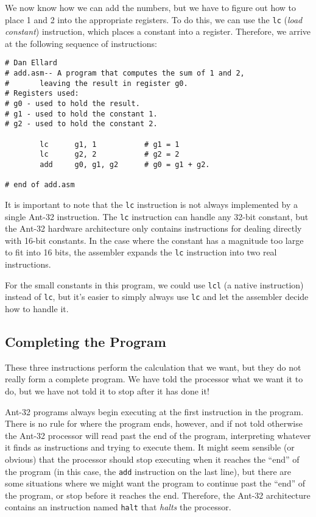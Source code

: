 We now know how we can add the numbers, but we have to figure out how
to place 1 and 2 into the appropriate registers.  To do this, we can
use the {\tt lc} ({\em load constant}) instruction, which places a
constant into a register.  Therefore, we arrive at the following
sequence of instructions:

{\codesize
\begin{verbatim}
# Dan Ellard
# add.asm-- A program that computes the sum of 1 and 2,
#       leaving the result in register g0.
# Registers used:
# g0 - used to hold the result.
# g1 - used to hold the constant 1.
# g2 - used to hold the constant 2.

        lc      g1, 1           # g1 = 1
        lc      g2, 2           # g2 = 2
        add     g0, g1, g2      # g0 = g1 + g2.

# end of add.asm
\end{verbatim}}

It is important to note that the {\tt lc} instruction is not
always implemented by a single Ant-32 instruction.  The {\tt lc}
instruction can handle any 32-bit constant, but the Ant-32
hardware architecture only contains instructions for dealing directly
with 16-bit constants.  In the case where the constant has a magnitude
too large to fit into 16 bits, the assembler expands the {\tt lc}
instruction into two real instructions.

For the small constants in this program, we could use {\tt lcl} (a
native instruction) instead of {\tt lc}, but it's easier to simply
always use {\tt lc} and let the assembler decide how to handle it.


\subsection{Completing the Program}

These three instructions perform the calculation that we want, but
they do not really form a complete program.  We have told the
processor what we want it to do, but we have not told it to stop
after it has done it!

Ant-32 programs always begin executing at the first instruction
in the program.  There is no rule for where the program ends, however,
and if not told otherwise the Ant-32 processor will read past
the end of the program, interpreting whatever it finds as instructions
and trying to execute them.  It might seem sensible (or obvious) that
the processor should stop executing when it reaches the ``end'' of the
program (in this case, the {\tt add} instruction on the last line),
but there are some situations where we might want the program to
continue past the ``end'' of the program, or stop before it reaches
the end.  Therefore, the Ant-32 architecture contains an
instruction named {\tt halt} that {\em halts} the processor.

